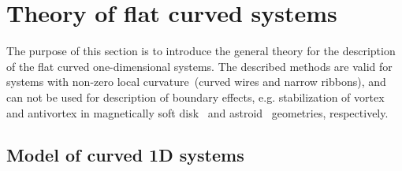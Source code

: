 \section{Theory of flat curved systems}\label{sec:theory_1D}

The purpose of this section is to introduce the general theory for the description of the flat curved one-dimensional systems. The described methods are valid for systems with non-zero local curvature~(curved wires and narrow ribbons), and can not be used for description of boundary effects, e.g.  stabilization of vortex and antivortex in magnetically soft disk~\cite{Shinjo00} and astroid~\cite{Shigeto02} geometries, respectively.

\subsection{Model of curved 1D systems}\label{sec:model_1D}

